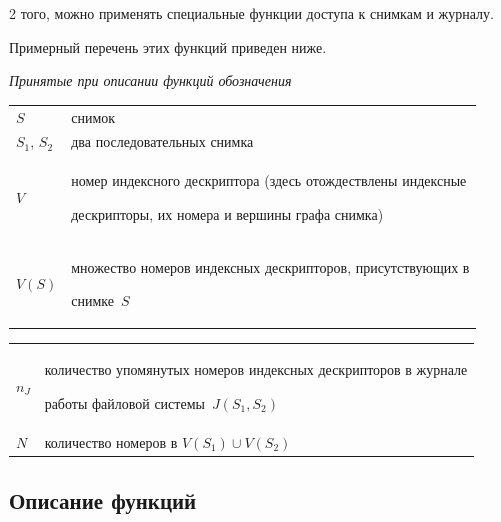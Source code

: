 \begin{multicols}{2}
того, можно применять специальные функции доступа к снимкам и журналу. 


Примерный перечень этих функций приведен ниже. 





\begin{center}


\textit{Принятые при описании функций обозначения}


\end{center}





\noindent


{\tabcolsep=3pt


\begin{tabular}{lp{67.5mm}}


$S$ & снимок\\


$S_1$, $S_2$ &  два последовательных снимка\\


$V$ &  номер индексного дескриптора (здесь отож\-де\-ст\-вле\-ны индексные 


дескрипторы, их номера и вершины графа снимка)\\


$V(S)$ & множество номеров индексных дескрипторов, присутствующих в 


снимке~$S$


\end{tabular}


}





\noindent


{\tabcolsep=3pt


\begin{tabular}{lp{72.5mm}}


$n_J$ & количество упомянутых номеров индексных дескрипторов в журнале 


работы файловой сис\-те\-мы~$J(S_1, S_2)$\\


$N$ & количество номеров в $V(S_1)\cup V(S_2)$


\end{tabular}


}





\subsection{Описание функций}






\end{multicols}
